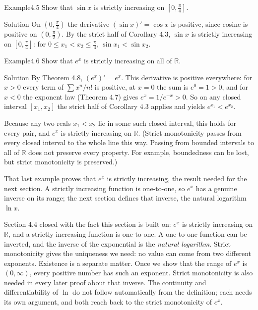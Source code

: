\documentclass[a4paper,12pt,oneside]{memoir}
\begin{document}
\begin{workedexample}
\begin{envexample}{Example}{4.5}{}
Show that \(\sin x\) is strictly increasing on \([0, \tfrac{\pi}{4}]\).
\end{envexample}
\begin{envsolution}{Solution}{}{}
On \((0, \tfrac{\pi}{4})\) the derivative \((\sin x)' = \cos x\) is positive, since cosine is positive on \((0, \tfrac{\pi}{2})\). By the strict half of Corollary 4.3, \(\sin x\) is strictly increasing on \([0, \tfrac{\pi}{4}]\): for \(0 \le x_{1} < x_{2} \le \tfrac{\pi}{4}\), \(\sin x_{1} < \sin x_{2}\). \qedmark
\end{envsolution}
\end{workedexample}
\begin{workedexample}
\begin{envexample}{Example}{4.6}{}
Show that \(e^{x}\) is strictly increasing on all of \(\mathbb{R}\).
\end{envexample}
\begin{envsolution}{Solution}{}{}
By Theorem 4.8, \((e^{x})' = e^{x}\). This derivative is positive everywhere: for \(x > 0\) every term of \(\sum x^{n}/n!\) is positive, at \(x = 0\) the sum is \(e^{0} = 1 > 0\), and for \(x < 0\) the exponent law (Theorem 4.7) gives \(e^{x} = 1/e^{-x} > 0\). So on any closed interval \([x_{1}, x_{2}]\) the strict half of Corollary 4.3 applies and yields \(e^{x_{1}} < e^{x_{2}}\).

Because any two reals \(x_{1} < x_{2}\) lie in some such closed interval, this holds for every pair, and \(e^{x}\) is strictly increasing on \(\mathbb{R}\). (Strict monotonicity passes from every closed interval to the whole line this way. Passing from bounded intervals to all of \(\mathbb{R}\) does not preserve every property. For example, boundedness can be lost, but strict monotonicity is preserved.) \qedmark
\end{envsolution}
\end{workedexample}
That last example proves that \(e^{x}\) is strictly increasing, the result needed for the next section. A strictly increasing function is one-to-one, so \(e^{x}\) has a genuine inverse on its range; the next section defines that inverse, the natural logarithm \(\ln x\).


Section 4.4 closed with the fact this section is built on: \(e^{x}\) is strictly increasing on \(\mathbb{R}\), and a strictly increasing function is one-to-one. A one-to-one function can be inverted, and the inverse of the exponential is the \emph{natural logarithm}. Strict monotonicity gives the uniqueness we need: no value can come from two different exponents. Existence is a separate matter. Once we show that the range of \(e^{x}\) is \((0,\infty)\), every positive number has such an exponent. Strict monotonicity is also needed in every later proof about that inverse. The continuity and differentiability of \(\ln\) do not follow automatically from the definition; each needs its own argument, and both reach back to the strict monotonicity of \(e^{x}\).
\end{document}
